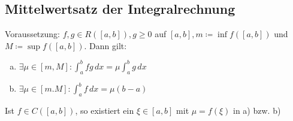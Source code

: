 \subsection{Mittelwertsatz der Integralrechnung}
Voraussetzung: $f,g \in R([a,b]), g \geq 0$ auf $[a,b], m \coloneqq \inf f([a,b])$ und $M \coloneqq \sup f([a,b])$. Dann gilt: \\
\begin{enumerate} [a)]
    \item $\exists \mu \in [m,M]: \int_a^b fg\,dx = \mu \int_a^b g\,dx$
    \item $\exists \mu \in [m.M]: \int_a^b f\,dx = \mu (b-a)$
\end{enumerate}
Ist $f \in C([a,b])$, so existiert ein $\xi \in [a,b]$ mit $\mu = f(\xi)$ in a) bzw. b)